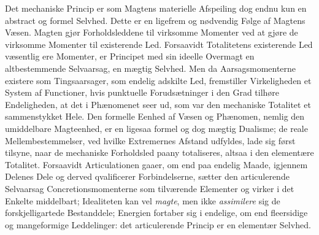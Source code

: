 \documentclass[12pt]{book}
\newcommand{\opage}[1]{\marginnote{\footnotesize\textit{[#1]}}}
\begin{document}
Det mechaniske Princip er som Magtens materielle Afspeiling dog endnu kun en abstract og formel
Selvhed. Dette er en ligefrem og nødvendig Følge af Magtens Væsen. Magten gjør Forholdsleddene
til virksomme Momenter ved at gjøre de virksomme Momenter til existerende Led. Forsaavidt
Totalitetens existerende Led væsentlig ere Momenter, er Principet med sin ideelle Overmagt en
altbestemmende Selvaarsag, en mægtig Selvhed. Men da Aarsagsmomenterne existere som Tingsaarsager,
som endelig adskilte Led, fremstiller Virkeligheden et System af Functioner, hvis punktuelle
Forudsætninger i den Grad tilhøre Endeligheden, at det i Phænomenet seer ud, som var den
mechaniske Totalitet et sammenstykket Hele.
\opage{403} Den formelle Eenhed af Væsen og Phænomen, nemlig den umiddelbare Magteenhed, er en ligesaa
formel og dog mægtig Dualisme; de reale Mellembestemmelser, ved hvilke Extremernes Afstand
udfyldes, lade sig først tilsyne, naar de mechaniske Forholdsled paany totaliseres, altsaa i den
elementære Totalitet. Forsaavidt Articulationen gaaer, om end paa endelig Maade, igjennem
Delenes Dele og derved qvalificerer Forbindelserne, sætter den articulerende Selvaarsag
Concretionsmomenterne som tilværende Elementer og virker i det Enkelte middelbart; Idealiteten
kan vel \emph{magte}, men ikke \emph{assimilere} sig de forskjelligartede Bestanddele; Energien
fortaber sig i endelige, om end fleersidige og mangeformige Leddelinger: det articulerende
Princip er en elementær Selvhed.
\end{document}
